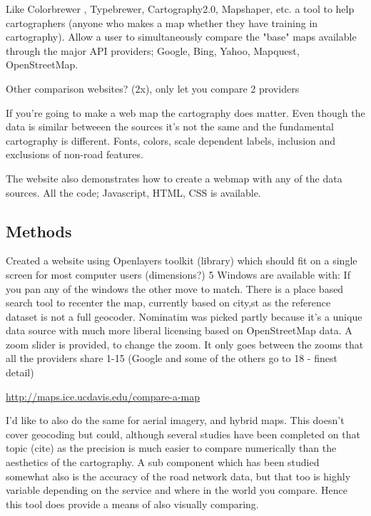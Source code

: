 \documentclass[12pt,letterpaper]{article}
\begin{document}
Like Colorbrewer \parencite{Brewer2003}, Typebrewer, Cartography2.0, Mapshaper, etc. a tool to help cartographers (anyone who makes a map whether they have training in cartography). Allow a user to simultaneously compare the "base" maps available through the major API providers; Google, Bing, Yahoo, Mapquest, OpenStreetMap.

Other comparison websites? (2x), only let you compare 2 providers

If you're going to make a web map the cartography does matter. Even though the data is similar betweeen the sources it's not the same and the fundamental cartography is different. 
Fonts, colors, scale dependent labels, inclusion and exclusions of non-road features.

The website also demonstrates how to create a webmap with any of the data sources. All the code; Javascript, HTML, CSS is available.

\subsection{Methods}
Created a website using Openlayers toolkit (library) which should fit on a single screen for most computer users (dimensions?)
5 Windows are available with:
If you pan any of the windows the other move to match.
There is a place based search tool to recenter the map, currently based on city,st as the reference dataset is not a full geocoder. Nominatim was picked partly because it's a unique data source with much more liberal licensing based on OpenStreetMap data.
A zoom slider is provided, to change the zoom. It only goes between the zooms that all the providers share 1-15 (Google and some of the others go to 18 - finest detail)

\url{http://maps.ice.ucdavis.edu/compare-a-map}

I'd like to also do the same for aerial imagery, and hybrid maps. This doesn't cover geocoding but could, although several studies have been completed on that topic (cite) as the precision is much easier to compare numerically than the aesthetics of the cartography. A sub component which has been studied somewhat also is the accuracy of the road network data, but that too is highly variable depending on the service and where in the world you compare. Hence this tool does provide a means of also visually comparing.

\end{document}
